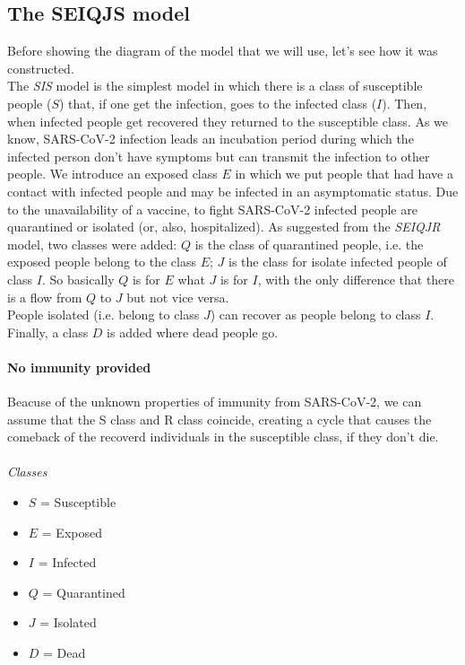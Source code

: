 \documentclass[12pt]{llncs}
\begin{document}
\subsection{The SEIQJS model}
Before showing the diagram of the model that we will use, let's see how it was constructed.\\
The \textit{SIS} model is the simplest model in which there is a class of susceptible people ($S$) that, if one get the infection, goes to the infected class ($I$). Then, when infected people get recovered they returned to the susceptible class.
As we know, SARS-CoV-2 infection leads an incubation period during which the infected person don't have symptoms but can transmit the infection to other people. We introduce an exposed class $E$ in which we put people that had have a contact with infected people and may be infected in an asymptomatic status.
Due to the unavailability of a vaccine, to fight SARS-CoV-2 infected people are quarantined or isolated (or, also, hospitalized). As suggested from the \textit{SEIQJR} model, two classes were added: $Q$ is the class of quarantined people, i.e. the exposed people belong to the class $E$; $J$ is the class for isolate infected people of class $I$. So basically $Q$ is for $E$ what $J$ is for $I$, with the only difference that there is a flow from $Q$ to $J$ but not vice versa.\\
People isolated (i.e. belong to class $J$) can recover as people belong to class $I$. Finally, a class $D$ is added where dead people go.

\paragraph{\textbf{No immunity provided}}
Beacuse of the unknown properties of immunity from SARS-CoV-2, we can assume that the S class and R class coincide, creating a cycle that causes the comeback of the recoverd individuals in the susceptible class, if they don't die.
\\\\
\textit{Classes}
\begin{multicols}{3}
\begin{itemize}
\item $S$ = Susceptible
\item $E$ = Exposed
\item $I$ = Infected
\item $Q$ = Quarantined
\item $J$ = Isolated
\item $D$ = Dead
\end{itemize}
\end{multicols}
\end{document}
